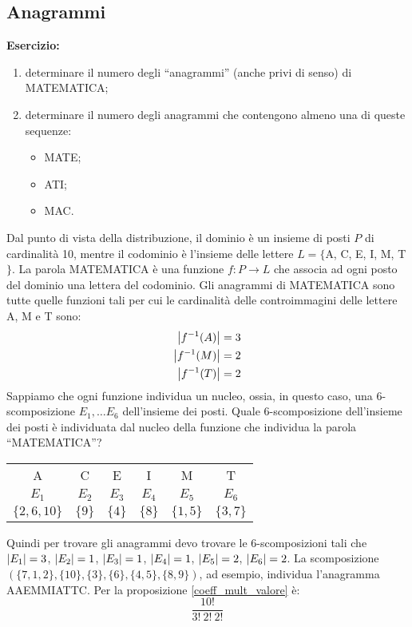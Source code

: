 \subsection{Anagrammi}

\textbf{Esercizio:} 
\begin{enumerate}
  \item determinare il numero degli ``anagrammi'' (anche privi di senso) di MATEMATICA;
  \item determinare il numero degli anagrammi che contengono almeno una di queste sequenze:
  \begin{itemize}
    \item MATE;
    \item ATI;
    \item MAC.
  \end{itemize}
\end{enumerate}

Dal punto di vista della distribuzione, il dominio \`e un insieme di posti $P$ di cardinalit\`a 10, mentre il codominio \`e l'insieme delle lettere $L = \{ $A, C, E, I, M, T$\}$. La parola MATEMATICA \`e una funzione $f : P \to L $ che associa ad ogni posto del dominio una lettera del codominio. Gli anagrammi di MATEMATICA sono tutte quelle funzioni tali per cui le cardinalit\`a delle controimmagini delle lettere A, M e T sono: 
\begin{align*}
\left\lvert{f^{-1}(A)}\right\rvert = 3 \\ 
\left\lvert{f^{-1}(M)}\right\rvert = 2 \\
\left\lvert{f^{-1}(T)}\right\rvert = 2
\end{align*}
Sappiamo che ogni funzione individua un nucleo, ossia, in questo caso, una $6$-scomposizione $E_1, \dots E_6$ dell'insieme dei posti. Quale $6$-scomposizione dell'insieme dei posti \`e individuata dal nucleo della funzione che individua la parola ``MATEMATICA''?

\begin{tabular}{c|c|c|c|c|c}
A & C & E & I & M & T \\
$E_1$ & $E_2$ & $E_3$ & $E_4$ & $E_5$ & $E_6$ \\
$\{2, 6, 10\}$ & $\{9\}$ & $\{4\}$ & $\{8\}$ & $\{1,5\}$ & $\{3,7\}$ 
\end{tabular}

Quindi per trovare gli anagrammi devo trovare le $6$-scomposizioni tali che $\left\lvert{E_1}\right\rvert = 3$, $\left\lvert{E_2}\right\rvert = 1$, $\left\lvert{E_3}\right\rvert = 1$, $\left\lvert{E_4}\right\rvert = 1$, $\left\lvert{E_5}\right\rvert = 2$, $\left\lvert{E_6}\right\rvert = 2$. La scomposizione $( \{ 7, 1, 2\}, \{ 10\}, \{3\}, \{ 6\}, \{4, 5\}, \{8,9\})$, ad esempio, individua l'anagramma AAEMMIATTC. Per la proposizione \ref{coeff_mult_valore} \`e:
\[
\frac{10!}{3! \ 2! \ 2!}
\]

